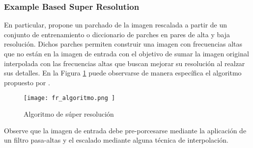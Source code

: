 \subsubsection{Example Based Super Resolution}
\noindent
En particular, \cite{freeman} propone un parchado de la imagen rescalada a partir
de un conjunto de entrenamiento o diccionario de parches en pares de alta
y baja resolución. Dichos parches permiten construir una imagen con frecuencias
altas que no están en la imagen de entrada con el objetivo de sumar la imagen
original interpolada con las frecuencias altas que buscan mejorar su resolución
al realzar sus detalles. En la Figura \ref{fig:fr_algoritmo} puede observarse de manera específica el algoritmo 
propuesto por \cite{freeman}.

\begin{figure}[H]
    \texttt{[image:  fr\_algoritmo.png ]}
    \centering
    \caption{ Algoritmo de súper resolución }
    \label{fig:fr_algoritmo}
\end{figure}

Observe que la imagen de entrada debe pre-porcesarse mediante la aplicación de un 
filtro pasa-altas y el escalado mediante alguna técnica de interpolación. 

